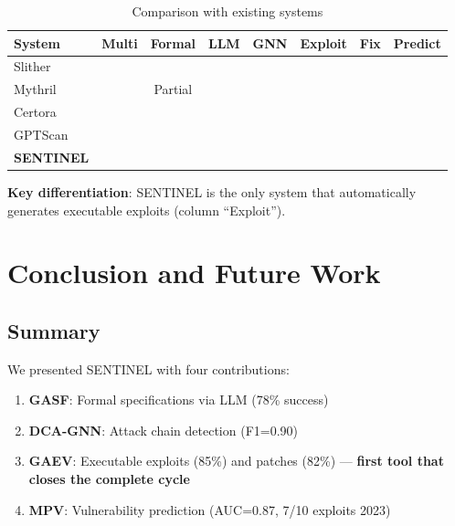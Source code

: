 \documentclass[11pt]{article}
\newcommand{\cmark}{\ding{51}}
\newcommand{\xmark}{\ding{55}}
\theoremstyle{definition}
\theoremstyle{plain}
\theoremstyle{remark}
\begin{document}
\begin{table}[H]
\centering
\caption{Comparison with existing systems}
\label{tab:related}
\begin{tabular}{lccccccc}
\toprule
\textbf{System} & \textbf{Multi} & \textbf{Formal} & \textbf{LLM} & \textbf{GNN} & \textbf{Exploit} & \textbf{Fix} & \textbf{Predict} \\
\midrule
Slither & \xmark & \xmark & \xmark & \xmark & \xmark & \xmark & \xmark \\
Mythril & \xmark & Partial & \xmark & \xmark & \xmark & \xmark & \xmark \\
Certora & \xmark & \cmark & \xmark & \xmark & \xmark & \xmark & \xmark \\
GPTScan & \xmark & \xmark & \cmark & \xmark & \xmark & \xmark & \xmark \\
\textbf{SENTINEL} & \cmark & \cmark & \cmark & \cmark & \cmark & \cmark & \cmark \\
\bottomrule
\end{tabular}
\end{table}

\textbf{Key differentiation}: SENTINEL is the only system that automatically generates executable exploits (column ``Exploit'').

\section{Conclusion and Future Work}
\label{sec:conclusion}

\subsection{Summary}

We presented SENTINEL with four contributions:

\begin{enumerate}[label=\textbf{C\arabic*:}]
    \item \textbf{GASF}: Formal specifications via LLM (78\% success)
    \item \textbf{DCA-GNN}: Attack chain detection (F1=0.90)
    \item \textbf{GAEV}: Executable exploits (85\%) and patches (82\%) --- \textbf{first tool that closes the complete cycle}
    \item \textbf{MPV}: Vulnerability prediction (AUC=0.87, 7/10 exploits 2023)
\end{enumerate}
\end{document}
